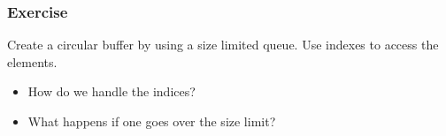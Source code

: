 \documentclass[11pt]{beamer}
\begin{document}
\begin{frame}\frametitle{Exercise}
\begin{block}{}
\Huge\centering Create a circular buffer by using a size limited queue. Use indexes to access the elements.
\end{block}
\begin{itemize}
\item How do we handle the indices?
\item What happens if one goes over the size limit?
\end{itemize}
\end{frame}
\end{document}
